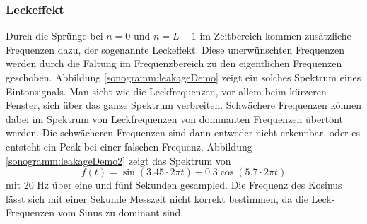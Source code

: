 \subsubsection{Leckeffekt}
Durch die Sprünge bei $n = 0$ und $n = L-1$ im Zeitbereich kommen zusätzliche Frequenzen dazu, der sogenannte
Leckeffekt.
Diese unerwünschten Frequenzen werden durch die Faltung im Frequenzbereich zu den eigentlichen Frequenzen 
geschoben.
Abbildung \ref{sonogramm:leakageDemo} zeigt ein solches Spektrum eines Eintonsignals.
Man sieht wie die Leckfrequenzen, vor allem beim kürzeren Fenster,
sich über das ganze Spektrum verbreiten.
Schwächere Frequenzen können dabei im Spektrum von Leckfrequenzen von dominanten Frequenzen
übertönt werden.
Die schwächeren Frequenzen sind dann entweder nicht erkennbar, oder es entsteht ein Peak 
bei einer falschen Frequenz. 
Abbildung \ref{sonogramm:leakageDemo2} zeigt das Spektrum von 
\begin{equation}
    f(t) = \sin(3.45\cdot 2\pi t) + 0.3  \cos(5.7\cdot  2\pi t)
\label{sonogramm:eq:sigLeck}
\end{equation}
mit 20 Hz über eine und fünf Sekunden gesampled.
Die Frequenz des Kosinus lässt sich mit einer Sekunde Messzeit nicht korrekt bestimmen, 
da die Leck-Frequenzen vom Sinus zu dominant sind.

